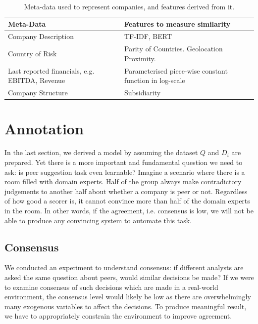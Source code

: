 \documentclass[]{article}
\begin{document}
\begin{table}[]
    \begin{tabular}{@{}p{4cm}p{7cm}@{}}
        \toprule
        Meta-Data                                      & Features to measure 
        similarity                            \\ \midrule
        Company Description                            & TF-IDF\cite{saltonIR}, 
        BERT\cite{devlin2018bert}                                      \\
        Country of Risk                                & Parity of Countries. 
        Geolocation Proximity.               \\
        Last reported financials, e.g. EBITDA, Revenue & Parameterised 
        piece-wise constant 
        function in log-scale \\
        Company Structure                              & 
        Subsidiarity                                              \\ \bottomrule
    \end{tabular}
\caption{Meta-data used to represent companies, and features derived from 
it.            \label{tab:features}}
\end{table}

\section{Annotation}
In the last section, we derived a model by assuming the dataset $Q$ 
and $D_i$ are prepared. Yet there is a more important and fundamental question 
we need to ask: is peer suggestion task even learnable? Imagine a scenario 
where there is a room filled with domain experts. Half of the group always 
make contradictory judgements to another half about whether a company is peer 
or not. Regardless of how good a scorer is, it cannot convince more than 
half of the domain experts in the room. In other words, if the agreement, i.e. 
consensus is low, we will not be able to produce any convincing system to 
automate this task.

\subsection{Consensus}
We conducted an experiment to understand consensus: if different 
analysts are asked the same question about peers, would similar decisions be 
made? If we were to examine consensus of such decisions which are made in a 
real-world environment, the consensus level would likely be low as there are 
overwhelmingly many exogenous variables to affect the decisions. To produce 
meaningful result, we have to appropriately constrain the environment to 
improve agreement. 
\end{document}
